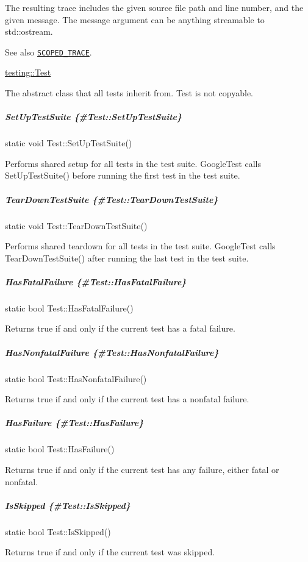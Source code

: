 The resulting trace includes the given source file path and line number, and the given message. The {\ttfamily message} argument can be anything streamable to {\ttfamily std\+::ostream}.

See also \href{#SCOPED_TRACE}{\tt {\ttfamily S\+C\+O\+P\+E\+D\+\_\+\+T\+R\+A\+CE}}.

{\ttfamily \mbox{\hyperlink{classtesting_1_1Test}{testing\+::\+Test}}}

The abstract class that all tests inherit from. {\ttfamily Test} is not copyable.

\subparagraph*{Set\+Up\+Test\+Suite \{\#\+Test\+::\+Set\+Up\+Test\+Suite\}}

{\ttfamily static void Test\+::\+Set\+Up\+Test\+Suite()}

Performs shared setup for all tests in the test suite. Google\+Test calls {\ttfamily Set\+Up\+Test\+Suite()} before running the first test in the test suite.

\subparagraph*{Tear\+Down\+Test\+Suite \{\#\+Test\+::\+Tear\+Down\+Test\+Suite\}}

{\ttfamily static void Test\+::\+Tear\+Down\+Test\+Suite()}

Performs shared teardown for all tests in the test suite. Google\+Test calls {\ttfamily Tear\+Down\+Test\+Suite()} after running the last test in the test suite.

\subparagraph*{Has\+Fatal\+Failure \{\#\+Test\+::\+Has\+Fatal\+Failure\}}

{\ttfamily static bool Test\+::\+Has\+Fatal\+Failure()}

Returns true if and only if the current test has a fatal failure.

\subparagraph*{Has\+Nonfatal\+Failure \{\#\+Test\+::\+Has\+Nonfatal\+Failure\}}

{\ttfamily static bool Test\+::\+Has\+Nonfatal\+Failure()}

Returns true if and only if the current test has a nonfatal failure.

\subparagraph*{Has\+Failure \{\#\+Test\+::\+Has\+Failure\}}

{\ttfamily static bool Test\+::\+Has\+Failure()}

Returns true if and only if the current test has any failure, either fatal or nonfatal.

\subparagraph*{Is\+Skipped \{\#\+Test\+::\+Is\+Skipped\}}

{\ttfamily static bool Test\+::\+Is\+Skipped()}

Returns true if and only if the current test was skipped.

